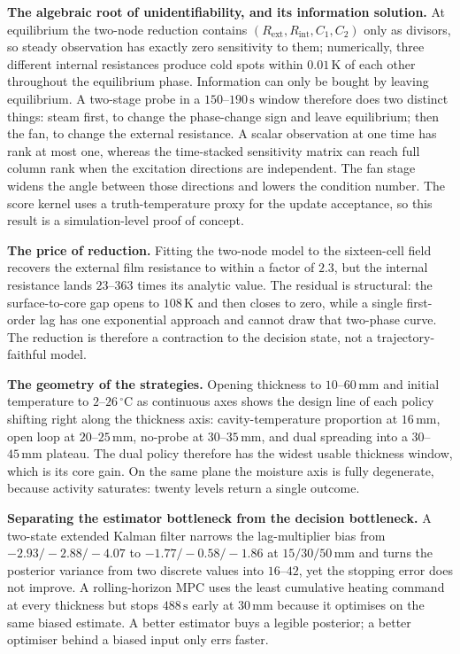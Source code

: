 \textbf{The algebraic root of unidentifiability, and its information solution.} At equilibrium the two-node reduction contains $(R_{\mathrm{ext}},R_{\mathrm{int}},C_1,C_2)$ only as divisors, so steady observation has exactly zero sensitivity to them; numerically, three different internal resistances produce cold spots within $0.01\,\mathrm{K}$ of each other throughout the equilibrium phase. Information can only be bought by leaving equilibrium. A two-stage probe in a $150$--$190\,\mathrm{s}$ window therefore does two distinct things: steam first, to change the phase-change sign and leave equilibrium; then the fan, to change the external resistance. A scalar observation at one time has rank at most one, whereas the time-stacked sensitivity matrix can reach full column rank when the excitation directions are independent. The fan stage widens the angle between those directions and lowers the condition number. The score kernel uses a truth-temperature proxy for the update acceptance, so this result is a simulation-level proof of concept.

\textbf{The price of reduction.} Fitting the two-node model to the sixteen-cell field recovers the external film resistance to within a factor of $2.3$, but the internal resistance lands $23$--$363$ times its analytic value. The residual is structural: the surface-to-core gap opens to $108\,\mathrm{K}$ and then closes to zero, while a single first-order lag has one exponential approach and cannot draw that two-phase curve. The reduction is therefore a contraction to the decision state, not a trajectory-faithful model.

\textbf{The geometry of the strategies.} Opening thickness to $10$--$60\,\mathrm{mm}$ and initial temperature to $2$--$26\,^{\circ}\mathrm{C}$ as continuous axes shows the design line of each policy shifting right along the thickness axis: cavity-temperature proportion at $16\,\mathrm{mm}$, open loop at $20$--$25\,\mathrm{mm}$, no-probe at $30$--$35\,\mathrm{mm}$, and dual spreading into a $30$--$45\,\mathrm{mm}$ plateau. The dual policy therefore has the widest usable thickness window, which is its core gain. On the same plane the moisture axis is fully degenerate, because activity saturates: twenty levels return a single outcome.

\textbf{Separating the estimator bottleneck from the decision bottleneck.} A two-state extended Kalman filter narrows the lag-multiplier bias from $-2.93/-2.88/-4.07$ to $-1.77/-0.58/-1.86$ at $15/30/50\,\mathrm{mm}$ and turns the posterior variance from two discrete values into $16$--$42$, yet the stopping error does not improve. A rolling-horizon MPC uses the least cumulative heating command at every thickness but stops $488\,\mathrm{s}$ early at $30\,\mathrm{mm}$ because it optimises on the same biased estimate. A better estimator buys a legible posterior; a better optimiser behind a biased input only errs faster.

